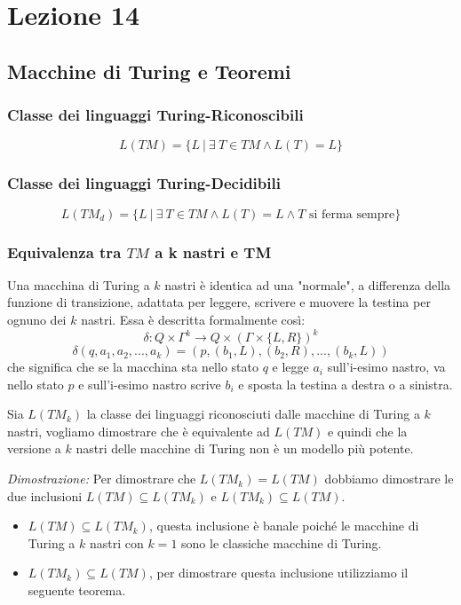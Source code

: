 
\section{Lezione 14}
\subsection{Macchine di Turing e Teoremi}
\subsubsection{Classe dei linguaggi Turing-Riconoscibili}
\[
	L(TM) = \{ L \ | \ \exists \ T \in TM \land L(T) = L \}
\]
\subsubsection{Classe dei linguaggi Turing-Decidibili}
\[
	L(TM_d) = \{ L \ | \ \exists \ T \in TM \land L(T) = L \land T \text{ si ferma sempre}\}
\]
\subsubsection{Equivalenza tra $TM$ a k nastri e TM} 
Una macchina di Turing a $k$ nastri è identica ad una "normale", a differenza della funzione di transizione, adattata per leggere, scrivere e muovere la testina per ognuno dei $k$ nastri. Essa è descritta formalmente così:
\[
	\delta: Q \times \Gamma^k \to Q \times (\Gamma \times \{ L, R \})^k
\]
\[
	\delta(q, a_1,a_2,...,a_k) = (p, (b_1,L), (b_2,R), ..., (b_k, L))
\]
che significa che se la macchina sta nello stato $q$ e legge $a_i$ sull'i-esimo nastro, va nello stato $p$ e sull'i-esimo nastro scrive $b_i$ e sposta la testina a destra o a sinistra.

Sia $L(TM_k)$ la classe dei linguaggi riconosciuti dalle macchine di Turing a $k$ nastri, vogliamo dimostrare che è equivalente ad $L(TM)$ e quindi che la versione a $k$ nastri delle macchine di Turing non \`e un modello pi\`u potente.


\textit{Dimostrazione:} Per dimostrare che $L(TM_k) = L(TM)$ dobbiamo dimostrare le due inclusioni $L(TM) \subseteq L(TM_k)$ e $L(TM_k) \subseteq L(TM)$.
\begin{itemize}
	\item $L(TM) \subseteq L(TM_k)$, questa inclusione è banale poiché le macchine di Turing a $k$ nastri con $k = 1$ sono le classiche macchine di Turing.
	\item $L(TM_k) \subseteq L(TM)$, per dimostrare questa inclusione utilizziamo il seguente teorema.
\end{itemize}
